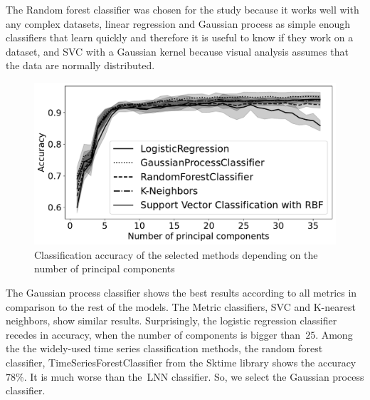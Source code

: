 \documentclass[sn-mathphys-num]{sn-jnl}
\theoremstyle{thmstylethree}
\theoremstyle{thmstyletwo}
\theoremstyle{thmstyleone}
\begin{document}
The Random forest classifier was chosen for the study because it works well with any complex
datasets, linear regression and Gaussian process as simple enough classifiers that learn quickly
and therefore it is useful to know if they work on a dataset, and SVC with a Gaussian kernel
because visual analysis assumes that the data are normally distributed.

\begin{figure}[!htbp]
 \centering
 \includegraphics[scale = 0.5]{Accuracy.pdf}
 \caption{Classification accuracy of the selected methods depending on the number of principal
components}
 \label{fig: Accuracy}
\end{figure}

The Gaussian process classifier shows the best results according to all metrics in comparison to the rest of the models. The Metric classifiers, SVC and K-nearest neighbors, show similar results. Surprisingly, the logistic regression classifier recedes in accuracy, when the number of components is bigger than~$25$.  Among the the widely-used time series classification methods, the random forest classifier,  TimeSeriesForestClassifier from the Sktime library shows the accuracy $78\%$. It is much worse than the~LNN classifier. So, we select the Gaussian process classifier. 
\end{document}
